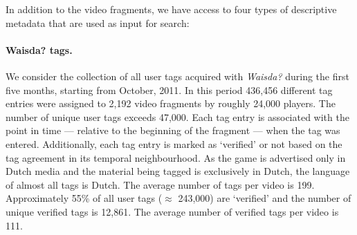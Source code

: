 

In addition to the video fragments, we have access to four types of descriptive metadata that are used as input for search:
\paragraph{\textbf{Waisda? tags.}} We consider the collection of all user tags acquired with \textit{Waisda?} during the first five months, starting from October, 2011. In this period 436,456 different tag entries were assigned to 2,192 video fragments by roughly 24,000 players. The number of unique user tags exceeds 47,000. Each tag entry is associated with the point in time --- relative to the beginning of the fragment --- when the tag was entered. Additionally, each tag entry is marked as `verified' or not based on the tag agreement in its temporal neighbourhood.
As the game is advertised only in Dutch media and the material being tagged is exclusively in Dutch, the language of almost all tags is Dutch. The average number of tags per video is 199. Approximately 55\% of all user tags ($\approx$ 243,000) are `verified' and the number of unique verified tags is 12,861. The average number of verified tags per video is 111.
